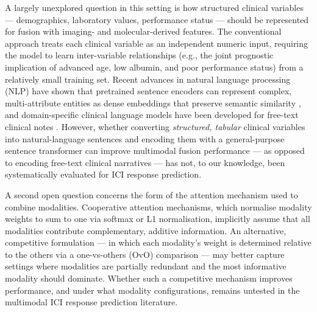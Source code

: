 A largely unexplored question in this setting is how structured clinical
variables --- demographics, laboratory values, performance status --- should
be represented for fusion with imaging- and molecular-derived features.
The conventional approach treats each clinical variable as an independent
numeric input, requiring the model to learn inter-variable relationships
(e.g., the joint prognostic implication of advanced age, low albumin, and
poor performance status) from a relatively small training set.
Recent advances in natural language processing (NLP) have shown that
pretrained sentence encoders can represent complex, multi-attribute entities
as dense embeddings that preserve semantic similarity
\cite{Reimers2019,Wang2020MiniLM}, and domain-specific clinical language
models have been developed for free-text clinical notes
\cite{Alsentzer2019}.
However, whether converting \emph{structured, tabular} clinical variables
into natural-language sentences and encoding them with a general-purpose
sentence transformer can improve multimodal fusion performance --- as
opposed to encoding free-text clinical narratives --- has not, to our
knowledge, been systematically evaluated for ICI response prediction.

A second open question concerns the form of the attention mechanism used to
combine modalities.
Cooperative attention mechanisms, which normalise modality weights to sum to
one via softmax or L1 normalisation, implicitly assume that all modalities
contribute complementary, additive information.
An alternative, competitive formulation --- in which each modality's weight
is determined relative to the others via a one-vs-others (OvO) comparison
--- may better capture settings where modalities are partially redundant and
the most informative modality should dominate.
Whether such a competitive mechanism improves performance, and under what
modality configurations, remains untested in the multimodal ICI response
prediction literature.

